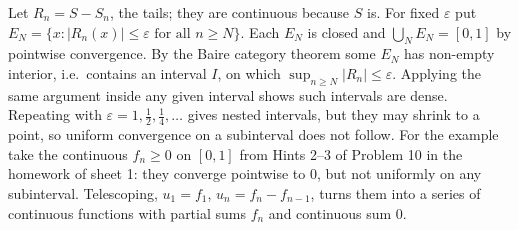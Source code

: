 \documentclass[11pt,a4paper]{article}
\begin{document}
Let \(R_n=S-S_n\), the tails; they are continuous because \(S\) is. For fixed \(\varepsilon\) put \(E_N=\{x:\lvert R_n(x)\rvert\le\varepsilon\text{ for all }n\ge N\}\). Each \(E_N\) is closed and \(\bigcup_NE_N=[0,1]\) by pointwise convergence.
By the Baire category theorem some \(E_N\) has non-empty interior, i.e.~contains an interval \(I\), on which \(\sup_{n\ge N}\lvert R_n\rvert\le\varepsilon\). Applying the same argument inside any given interval shows such intervals are dense. Repeating with \(\varepsilon=1,\frac12,\frac14,\dots\) gives nested intervals, but they may shrink to a point, so uniform convergence on a subinterval does not follow.
For the example take the continuous \(f_n\ge0\) on \([0,1]\) from Hints 2--3 of Problem 10 in the homework of sheet 1: they converge pointwise to \(0\), but not uniformly on any subinterval. Telescoping, \(u_1=f_1\), \(u_n=f_n-f_{n-1}\), turns them into a series of continuous functions with partial sums \(f_n\) and continuous sum \(0\).
\end{document}
